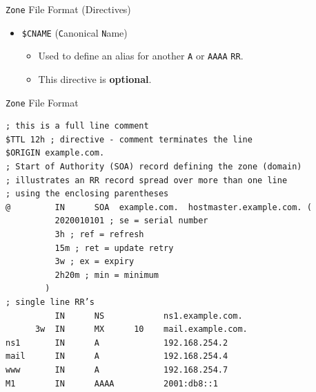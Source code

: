 \documentclass[xcolor=table]{beamer}
\begin{document}
\begin{frame}{\texttt{Zone} File Format (Directives)}
  \begin{itemize}
    \item \texttt{\$CNAME} (\texttt{C}anonical \texttt{N}ame)
       \begin{itemize}
          \item Used to define an alias for another \texttt{A} or \texttt{AAAA} \texttt{RR}.
          \item This directive is \textbf{optional}.
       \end{itemize}
  \end{itemize}
\end{frame}

\begin{frame}[fragile]{\texttt{Zone} File Format}
  \lstset{
    basicstyle=\scriptsize\ttfamily,
  }
  \begin{lstlisting}
; this is a full line comment
$TTL 12h ; directive - comment terminates the line
$ORIGIN example.com.
; Start of Authority (SOA) record defining the zone (domain)
; illustrates an RR record spread over more than one line
; using the enclosing parentheses
@         IN      SOA  example.com.  hostmaster.example.com. (
          2020010101 ; se = serial number
          3h ; ref = refresh
          15m ; ret = update retry
          3w ; ex = expiry
          2h20m ; min = minimum
        )
; single line RR’s
          IN      NS            ns1.example.com.
      3w  IN      MX      10    mail.example.com.
ns1       IN      A             192.168.254.2
mail      IN      A             192.168.254.4
www       IN      A             192.168.254.7
M1        IN	  AAAA          2001:db8::1
  \end{lstlisting}
\end{frame}
\end{document}
